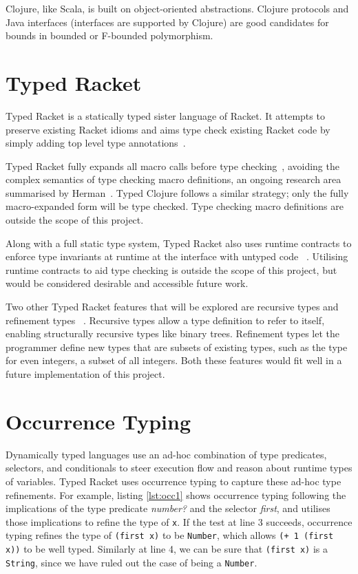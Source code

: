 Clojure, like Scala, is built on object-oriented abstractions. Clojure protocols
and Java interfaces (interfaces are supported by Clojure) are good candidates
for bounds in bounded or F-bounded polymorphism.

\section{Typed Racket}

Typed Racket is a statically typed sister language of Racket. It
attempts to preserve existing Racket idioms and aims type check
existing Racket code by simply adding top level type annotations~\cite{Tob10}.

Typed Racket fully expands all macro calls before type checking~\cite{Tob10},
avoiding the complex semantics of type checking macro definitions, an ongoing research area summarised
 by Herman~\cite{Her10}.
Typed Clojure follows a similar strategy; only the fully macro-expanded form
will be type checked. Type checking macro definitions are outside the scope of this project.

Along with a full static type system, Typed Racket 
also uses runtime contracts to enforce type invariants at runtime
at the interface with untyped code ~\cite{TF08}.
Utilising runtime contracts to aid type checking is outside the scope of this project, but would be 
considered desirable and accessible future work.

Two other Typed Racket features that will be explored are recursive types and refinement types  
~\cite{Tob10}. Recursive types allow a type definition to refer to itself, enabling structurally
recursive types like binary trees. Refinement types let the programmer define
new types that are subsets of existing types, such as the type for even integers, a subset of all integers.
Both these features would fit well in a future implementation of this project.

\section{Occurrence Typing}
\label{sec:OccurrenceTyping}

Dynamically typed languages use an ad-hoc combination of type predicates,
selectors, and conditionals to steer execution flow and reason about runtime types of variables.
Typed Racket uses occurrence typing to capture these ad-hoc type refinements.
For example, listing \ref{lst:occ1} shows occurrence typing following the implications 
of the type predicate \emph{number?} and the selector \emph{first}, and utilises those implications to refine
the type of \lstinline|x|. If the test at line 3 succeeds, occurrence typing refines the
type of \lstinline|(first x)| to be \lstinline|Number|, which allows \lstinline|(+ 1 (first x))|
to be well typed. Similarly at line 4, we can be sure that \lstinline|(first x)| is
a \lstinline|String|, since we have ruled out the case of being a \lstinline|Number|.

